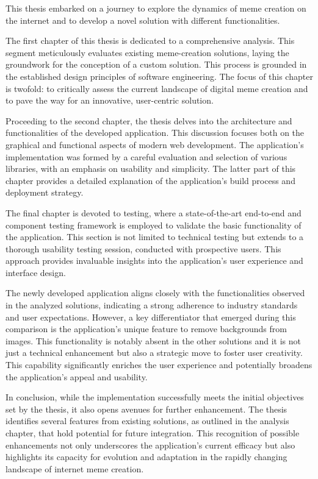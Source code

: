This thesis embarked on a journey to explore the dynamics of meme creation on the internet and to develop a novel solution with different functionalities.

The first chapter of this thesis is dedicated to a comprehensive analysis. This segment meticulously evaluates existing meme-creation solutions, laying the groundwork for the conception of a custom solution. This process is grounded in the established design principles of software engineering. The focus of this chapter is twofold: to critically assess the current landscape of digital meme creation and to pave the way for an innovative, user-centric solution.

Proceeding to the second chapter, the thesis delves into the architecture and functionalities of the developed application. This discussion focuses both on the graphical and functional aspects of modern web development. The application's implementation was formed by a careful evaluation and selection of various libraries, with an emphasis on usability and simplicity. The latter part of this chapter provides a detailed explanation of the application's build process and deployment strategy.

The final chapter is devoted to testing, where a state-of-the-art end-to-end and component testing framework is employed to validate the basic functionality of the application. This section is not limited to technical testing but extends to a thorough usability testing session, conducted with prospective users. This approach provides invaluable insights into the application's user experience and interface design.

The newly developed application aligns closely with the functionalities observed in the analyzed solutions, indicating a strong adherence to industry standards and user expectations. However, a key differentiator that emerged during this comparison is the application's unique feature to remove backgrounds from images. This functionality is notably absent in the other solutions and it is not just a technical enhancement but also a strategic move to foster user creativity. This capability significantly enriches the user experience and potentially broadens the application's appeal and usability.

In conclusion, while the implementation successfully meets the initial objectives set by the thesis, it also opens avenues for further enhancement. The thesis identifies several features from existing solutions, as outlined in the analysis chapter, that hold potential for future integration. This recognition of possible enhancements not only underscores the application's current efficacy but also highlights its capacity for evolution and adaptation in the rapidly changing landscape of internet meme creation.

